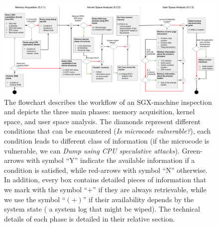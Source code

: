 \begin{figure}
	\centering
	\includegraphics[width=\linewidth]{fig_c8/final_schema_sgx.pdf}
	\caption{The flowchart describes the workflow of an SGX-machine inspection 
		and depicts the three main phases: memory acquisition, kernel space, 
		and 
		user space analysis.
		The diamonds represent different conditions that can be 
		encountered (\eg \emph{Is microcode vulnerable?}), each condition leads 
		to 
		different class of information (\eg if the microcode is vulnerable, we 
		can 
		\emph{Dump using CPU speculative attacks}). Green-arrows with symbol 	
		``Y'' indicate the available information if a condition is satisfied, 
		while 
		red-arrows with symbol ``N'' otherwise.
		In addition, every box contains detailed pieces of information that we 
		mark 
		with the symbol ``$+$'' if they are always retrievable, while we use 
		the 
		symbol ``$(+)$'' if their availability depends by the system state (\eg 
		a 
		system log that might be wiped). 
		The technical details of each phase is detailed in their relative 
		section.}
	\label{fig:analysis-map}
\end{figure}


